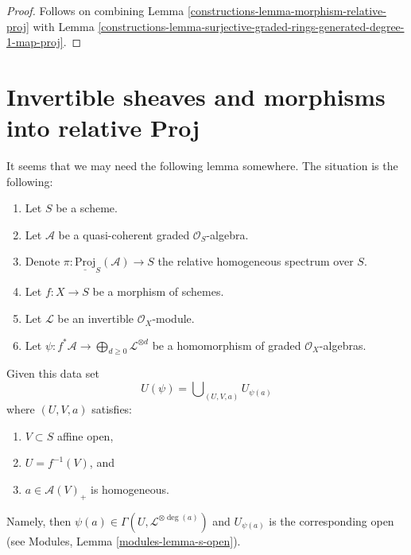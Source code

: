 \begin{proof}

Follows on combining
Lemma \ref{constructions-lemma-morphism-relative-proj}
with
Lemma \ref{constructions-lemma-surjective-graded-rings-generated-degree-1-map-proj}.
\end{proof}

\section{Invertible sheaves and morphisms into relative Proj}
\label{constructions-section-invertible-relative-proj}
It seems that we may need the following lemma somewhere.
The situation is the following:
\begin{enumerate}
\item Let $S$ be a scheme.
\item Let $\mathcal{A}$ be a quasi-coherent graded $\mathcal{O}_S$-algebra.
\item Denote $\pi : \underline{\text{Proj}}_S(\mathcal{A}) \to S$ the relative
homogeneous spectrum over $S$.
\item Let $f : X \to S$ be a morphism of schemes.
\item Let $\mathcal{L}$ be an invertible $\mathcal{O}_X$-module.
\item Let $\psi : f^*\mathcal{A} \to
\bigoplus_{d \geq 0} \mathcal{L}^{\otimes d}$
be a homomorphism of graded $\mathcal{O}_X$-algebras.
\end{enumerate}
Given this data set
$$
U(\psi) = \bigcup\nolimits_{(U, V, a)} U_{\psi(a)}
$$
where $(U, V, a)$ satisfies:
\begin{enumerate}
\item $V \subset S$ affine open,
\item $U = f^{-1}(V)$, and
\item $a \in \mathcal{A}(V)_{+}$ is homogeneous.
\end{enumerate}
Namely, then $\psi(a) \in \Gamma(U, \mathcal{L}^{\otimes \deg(a)})$
and $U_{\psi(a)}$ is the corresponding open (see
Modules, Lemma \ref{modules-lemma-s-open}).

